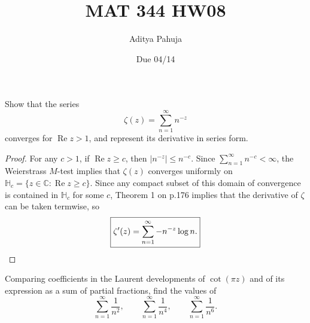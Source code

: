 \documentclass[10pt]{article}
\title{MAT 344 HW08}
\author{\large Aditya Pahuja}
\date{\large Due 04/14}
\providecommand{\CC}{\mathbb C}
\providecommand{\smabs}[1]{\lvert #1\rvert}
\begin{document}
\maketitle

\begin{problem}
    [p.178\#2]
    Show that the series
    \begin{equation*}
	\zeta(z) = \sum_{n=1}^\infty n^{-z}
    \end{equation*}
    converges for $\operatorname{Re} z > 1$,
    and represent its derivative in series form.
\end{problem}

\begin{proof}
    For any $c > 1$, if $\operatorname{Re} z \ge c$, then
    $\smabs{n^{-z}} \le n^{-c}$.
    Since $\sum_{n=1}^\infty n^{-c} < \infty$,
    the Weierstrass $M$-test implies that $\zeta(z)$ converges
    uniformly on $\mathbb H_c = \{z\in\CC : \operatorname{Re} z\ge c\}$.
    Since any compact subset of this domain of convergence
    is contained in $\mathbb H_c$ for some $c$,
    Theorem 1 on p.176 implies that the derivative of $\zeta$
    can be taken termwise, so
    \begin{equation*}
	\boxed{\zeta'(z) = \sum_{n=1}^\infty -n^{-z}\log n.}\qedhere
    \end{equation*}
\end{proof}

\begin{problem}
    [p.190\#1]
    Comparing coefficients in the Laurent developments of $\cot(\pi z)$
    and of its expression as a sum of partial fractions,
    find the values of
    \begin{equation*}
	\sum_{n=1}^\infty \frac 1{n^2},\qquad
	\sum_{n=1}^\infty \frac 1{n^4},\qquad
	\sum_{n=1}^\infty \frac 1{n^6}.
    \end{equation*}
\end{problem}
\end{document}
